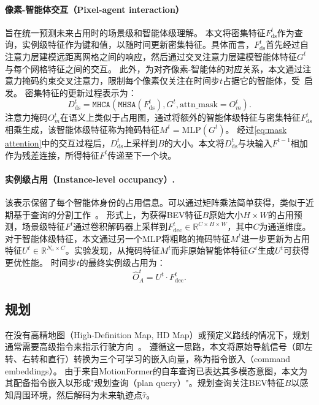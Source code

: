 \documentclass[10pt,twocolumn,letterpaper]{article}
\begin{document}
\paragraph{像素-智能体交互（Pixel-agent interaction）} 旨在统一预测未来占用时的场景级和智能体级理解。
%
本文将密集特征$F_\text{ds}^t$作为查询，实例级特征作为键和值，以随时间更新密集特征。具体而言，$F^t_{\text{ds}}$首先经过自注意力层建模远距离网格之间的响应，然后通过交叉注意力层建模智能体特征${G^{t}}$与每个网格特征之间的交互。
%
此外，为对齐像素-智能体的对应关系，本文通过注意力掩码约束交叉注意力，限制每个像素仅关注在时间步$t$占据它的智能体，受~\cite{cheng2021mask2former}启发。
%
密集特征的更新过程表示为：
\begin{equation}
\label{eq:mask attention}
    D_{\text{ds}}^t = \texttt{MHCA}( \texttt{MHSA}(F_{\text{ds}}^t), G^t, \text{attn\_mask} = O_m^t).
\end{equation}
注意力掩码$O_m^t$在语义上类似于占用图，通过将额外的智能体级特征与密集特征$F_{\text{ds}}^t$相乘生成，该智能体级特征称为掩码特征$M^t=\text{MLP}({G^{t}})$。
%
经过\cref{eq:mask attention}中的交互过程后，$D_{\text{ds}}^t$上采样到$B$的大小。本文将$D_{\text{ds}}^t$与块输入$F^{t-1}$相加作为残差连接，所得特征$F^t$传递至下一个块。

\vspace{-7pt}
\paragraph{实例级占用（Instance-level occupancy）.} 该表示保留了每个智能体身份的占用信息。可以通过矩阵乘法简单获得，类似于近期基于查询的分割工作~\cite{cheng2021maskformer, li2022maskdino}。
%
形式上，为获得BEV特征$B$原始大小$H\!\times\!W$的占用预测，场景级特征$F^t$通过卷积解码器上采样到$F_{\text{dec}}^t\!\in\!\mathbb{R}^{C\!\times\!H\!\times\!W}$，其中$C$为通道维度。
%
对于智能体级特征，本文通过另一个MLP将粗略的掩码特征$M^t$进一步更新为占用特征$U^t\!\in\!\mathbb{R}^{N_a\!\times\!C}$。实验发现，从掩码特征$M^t$而非原始智能体特征${G^{t}}$生成$U^t$可获得更优性能。
%
时间步$t$的最终实例级占用为：
\begin{equation}
    \hat{O}_A^t = U^t \cdot F_{\text{dec}}^t.
\end{equation}


\subsection{规划}
\label{sec:method-plan}
\vspace{-4pt}
在没有高精地图（High-Definition Map, HD Map）或预定义路线的情况下，规划通常需要高级指令来指示行驶方向~\cite{casas2021mp3, hu2022stp3}。
%
遵循这一思路，本文将原始导航信号（即左转、右转和直行）转换为三个可学习的嵌入向量，称为指令嵌入（command embeddings）。
%
由于来自MotionFormer的自车查询已表达其多模态意图，本文为其配备指令嵌入以形成"规划查询（plan query）"。规划查询关注BEV特征$B$以感知周围环境，然后解码为未来轨迹点$\hat{\tau}$。
\end{document}
